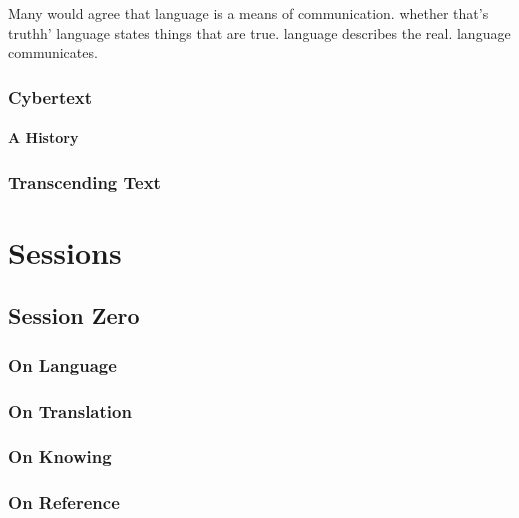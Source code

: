 \documentclass[10pt,twoside,twocolumn,openany,nomultitoc]{book}
\begin{document}
     Many would agree that language is a means of communication. whether that's truthh'
     language states things that are true. language describes the real. language communicates.
     

     
     

     

\section{Cybertext}\vspace{2pt}
\subsection{A History}
    \lipsum[2]
\section{Transcending Text}
    \lipsum[6]

\part{Sessions}

\chapter{Session Zero}\vspace{6pt}

\begin{DndReadAloud}
  \lipsum[1]
\end{DndReadAloud}


\section{On Language}

\section{On Translation}
    \lipsum[1]
\section{On Knowing}
    \lipsum[2]
\section{On Reference}
    \lipsum[3]
    
\end{document}
